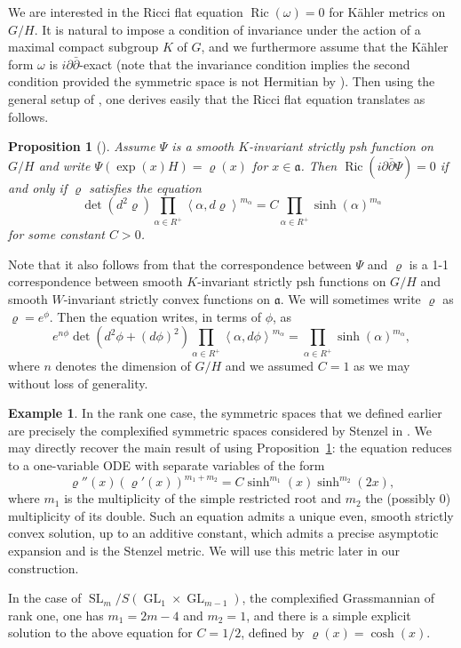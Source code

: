 \documentclass[JEP,XML,SOM,Unicode, NoEqCountersInSection, NoFloatCountersInSection]{cedram}
\theoremstyle{plain}
\newtheorem{prop}[thm]{Proposition}
\theoremstyle{definition}
\newtheorem{exa}[thm]{Example}
\DeclareMathOperator{\Ric}{Ric}
\DeclareMathOperator{\SL}{SL}
\DeclareMathOperator{\GL}{GL}
\newcommand{\fa}{\mathfrak{a}}
\newcommand{\rRoots}{R}
\begin{document}
We are interested in the Ricci flat equation $\Ric(\omega)=0$ for Kähler metrics
on $G/H$. It is natural to impose a condition of invariance under the action of
a maximal compact subgroup $K$ of $G$, and we furthermore assume that the Kähler
form $\omega$ is $i\partial\bar{\partial}$-exact (note that the invariance
condition implies the second condition provided the symmetric space is not
Hermitian by \cite{AL92}). Then using the general setup of \cite{DelHoro},
one derives easily that the Ricci flat equation translates as follows.

\begin{prop}[\cite{DelHoro}]
\label{prop:Ric-eqn}
Assume $\Psi$ is a smooth $K$-invariant strictly psh function on $G/H$ and write
$\Psi(\exp(x)H)=\varrho(x)$ for $x\in \mathfrak{a}$. Then
$\Ric(i\partial \bar{\partial} \Psi)=0$ if and only if $\varrho$ satisfies
the equation
\begin{equation}\label{eq:12}
\det(d^2\varrho)\prod_{\alpha\in \rRoots^+} \left<\alpha,d\varrho\right>^{m_{\alpha}} =
C \prod_{\alpha\in \rRoots^+} \sinh(\alpha)^{m_{\alpha}}
\end{equation}
for some constant $C>0$.
\end{prop}

Note that it also follows from \cite{AL92} that the correspondence between $\Psi$
and $\varrho$ is a 1-1 correspondence between smooth $K$-invariant strictly psh
functions on $G/H$ and smooth $W$-invariant strictly convex functions on $\fa$.
We will sometimes write $\varrho$ as $\varrho=e^{\phi}$. Then the equation writes, in terms of
$\phi$, as
\begin{equation}
e^{n\phi}\det(d^2\phi+(d\phi)^2)\prod_{\alpha\in \rRoots^+} \left<\alpha,d\phi\right>^{m_{\alpha}} =
\prod_{\alpha\in \rRoots^+} \sinh(\alpha)^{m_{\alpha}},
\end{equation}
where $n$ denotes the dimension of $G/H$ and we assumed $C=1$ as we may without loss of generality.

\begin{exa}
\label{exa-Stenzel}
In the rank one case, the symmetric spaces that we defined earlier are precisely
the complexified symmetric spaces considered by Stenzel in \cite{Ste93}.
We may directly recover the main result of \cite{Ste93} using
Proposition~\ref{prop:Ric-eqn}: the equation reduces to
a one-variable ODE with separate variables of the form
\[ \varrho''(x) (\varrho'(x))^{m_1+m_2} = C\sinh^{m_1}(x)\sinh^{m_2}(2x), \]
where $m_1$ is the multiplicity of the simple restricted root and $m_2$ the
(possibly $0$) multiplicity of its double. Such an equation admits a unique
even, smooth strictly convex solution, up to an additive constant, which admits a precise
asymptotic expansion and is the Stenzel metric. We will use this metric later
in our construction.

In the case of $\SL_m/S(\GL_1\times \GL_{m-1})$, the complexified Grassmannian of rank one,
one has $m_1=2m-4$ and $m_2=1$,
and there is a simple explicit solution to the above equation
for $C=1/2$, defined by $\varrho(x)=\cosh(x)$.
\end{exa}
\end{document}
